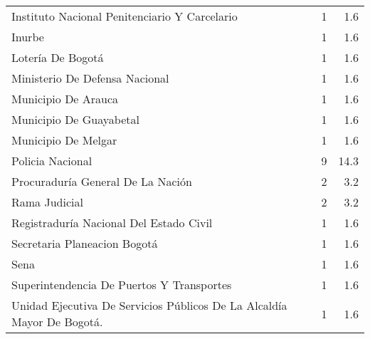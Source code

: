 \begin{table}[H]
{\begin{tabular}{p{11cm}rr}
  Instituto Nacional Penitenciario Y Carcelario &  1 & 1.6 \\ 
  Inurbe &  1 & 1.6 \\ 
  Lotería De Bogotá &  1 & 1.6 \\ 
  Ministerio De Defensa Nacional &  1 & 1.6 \\ 
  Municipio De Arauca &  1 & 1.6 \\ 
  Municipio De Guayabetal &  1 & 1.6 \\ 
  Municipio De Melgar &  1 & 1.6 \\ 
  Policia Nacional &  9 & 14.3 \\ 
  Procuraduría General De La Nación &  2 & 3.2 \\ 
  Rama Judicial &  2 & 3.2 \\ 
  Registraduría Nacional Del Estado Civil &  1 & 1.6 \\ 
  Secretaria Planeacion Bogotá &  1 & 1.6 \\ 
  Sena &  1 & 1.6 \\ 
  Superintendencia De Puertos Y Transportes &  1 & 1.6 \\ 
  Unidad  Ejecutiva  De  Servicios  Públicos  De  La  Alcaldía  Mayor De Bogotá. &  1 & 1.6 \\ 
   \hline
\end{tabular}
}
\end{table}
